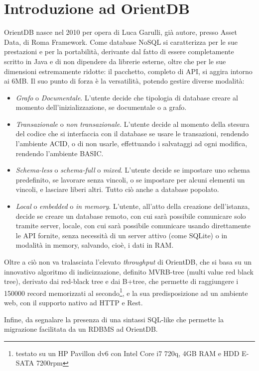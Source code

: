 \section{Introduzione ad OrientDB}
OrientDB nasce nel 2010 per opera di Luca Garulli, già autore, presso Asset Data, di Roma Framework. Come database NoSQL si caratterizza per le sue prestazioni e per la portabilità, derivante dal fatto di essere completamente scritto in Java e di non dipendere da librerie esterne, oltre che per le sue dimensioni estremamente ridotte: il pacchetto, completo di API, si aggira intorno ai 6MB.
Il suo punto di forza è la versatilità, potendo gestire diverse modalità:
\begin{itemize}
\item \emph{Grafo} o \emph{Documentale}. L'utente decide che tipologia di database creare al momento dell'inizializzazione, se documentale o a grafo.
\item \emph{Transazionale} o \emph{non transazionale}. L'utente decide al momento della stesura del codice che si interfaccia con il database se usare le transazioni, rendendo l'ambiente ACID, o di non usarle, effettuando i salvataggi ad ogni modifica, rendendo l'ambiente BASIC.
\item \emph{Schema-less} o \emph{schema-full} o \emph{mixed}. L'utente decide se impostare uno schema predefinito, se lavorare senza vincoli, o se impostare per alcuni elementi un vincoli, e lasciare liberi altri. Tutto ciò anche a database popolato.
\item \emph{Local} o \emph{embedded} o \emph{in memory}. L'utente, all'atto della creazione dell'istanza, decide se creare un database remoto, con cui sarà possibile comunicare solo tramite server, locale, con cui sarà possibile comunicare usando direttamente le API fornite, senza necessità di un server attivo (come SQLite) o in modalità in memory, salvando, cioè, i dati in RAM.
\end{itemize}

Oltre a ciò non va tralasciata l'elevato \emph{throughput} di OrientDB, che si basa su un innovativo algoritmo di indicizzazione, definito MVRB-tree (multi value red black tree), derivato dai red-black tree e dai B+tree, che permette di raggiungere i 150000 record memorizzati al secondo\footnote{testato su un HP Pavillon dv6 con Intel Core i7 720q, 4GB RAM e HDD E-SATA 7200rpm}, e la sua predisposizione ad un ambiente web, con il supporto nativo ad HTTP e Rest.

Infine, da segnalare la presenza di una sintassi SQL-like che permette la migrazione facilitata da un RDBMS ad OrientDB.

